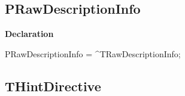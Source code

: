 \documentclass{report}
\newif\ifpdf
\begin{document}
\subsection*{PRawDescriptionInfo}
\fi
\label{PasDoc_Items-PRawDescriptionInfo}
\begin{list}{}{
\setlength{\itemindent}{0cm}
\setlength{\listparindent}{0cm}
\setlength{\leftmargin}{\evensidemargin}
\addtolength{\leftmargin}{\tmplength}
\settowidth{\labelsep}{X}
\addtolength{\leftmargin}{\labelsep}
\setlength{\labelwidth}{\tmplength}
}
\item[\textbf{Declaration}\hfill]
\ifpdf
\begin{flushleft}
\fi
\begin{ttfamily}
PRawDescriptionInfo = {\^{}}TRawDescriptionInfo;\end{ttfamily}

\ifpdf
\end{flushleft}
\fi

\end{list}
\ifpdf
\subsection*{\large{\textbf{THintDirective}}\normalsize\hspace{1ex}\hrulefill}
\else
\end{document}
